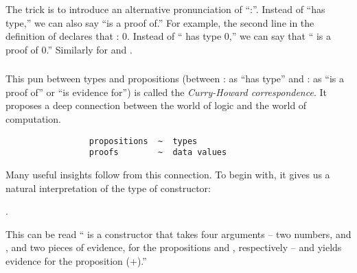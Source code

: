 \documentclass[12pt]{report}
\begin{document}
 The trick is to introduce an alternative pronunciation of ``:''.
    Instead of ``has type,'' we can also say ``is a proof of.''  For
    example, the second line in the definition of  declares
    that  :  0.  Instead of `` has type 
     0,'' we can say that `` is a proof of  0.''
    Similarly for  and . 

\subsubsection{ }



 This pun between types and propositions (between : as ``has type''
    and : as ``is a proof of'' or ``is evidence for'') is called the
    \textit{Curry-Howard correspondence}.  It proposes a deep connection
    between the world of logic and the world of computation.
\begin{verbatim}
                 propositions  ~  types
                 proofs        ~  data values
\end{verbatim}
    Many useful insights follow from this connection.  To begin with, it
    gives us a natural interpretation of the type of  constructor: \begin{coqdoccode}
\coqdocemptyline
\coqdocnoindent
{} .\coqdoceol
\end{coqdoccode}
This can be read `` is a constructor that takes four
    arguments -- two numbers,  and , and two pieces of evidence,
    for the propositions   and  , respectively -- 
    and yields evidence for the proposition  (+).'' 
\end{document}
